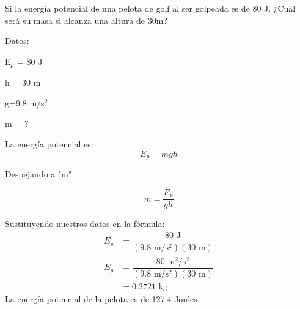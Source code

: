 Si la energía potencial de una pelota de golf al ser golpeada es de 80 J. ¿Cuál será su masa si alcanza una altura de 30m?

\begin{solutionbox}{7.5cm}
    \begin{multicols}{2}
        Datos:

        E$_p$ = 80 J

        h = 30 m

        g=9.8 m/s$^2$

        m = ?

        La energía potencial es:
        \[E_p=mgh\]

        \vspace{2cm}

        Despejando a "m"

        \[m=\dfrac{E_p}{gh}\]


        Sustituyendo nuestros datos en la fórmula:
        \[
            \begin{array}{rl}
                E_p & = \dfrac{80 \text{ J}}{(9.8 \text{ m/s$^2$})(30 \text{ m})}           \\[1em]
                E_p & = \dfrac{80 \text{ m$^2$/s$^2$}}{(9.8 \text{ m/s$^2$})(30 \text{ m})} \\[1em]
                    & =0.2721 \text{ kg }
            \end{array}
        \]
        La energía potencial de la pelota es de 127.4 Joules.
    \end{multicols}
\end{solutionbox}
